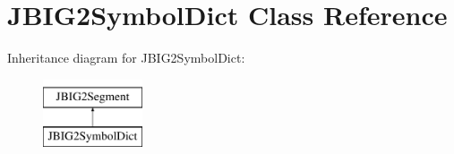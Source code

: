 \hypertarget{class_j_b_i_g2_symbol_dict}{}\section{J\+B\+I\+G2\+Symbol\+Dict Class Reference}
\label{class_j_b_i_g2_symbol_dict}
Inheritance diagram for J\+B\+I\+G2\+Symbol\+Dict\+:\begin{figure}[H]
\begin{center}
\leavevmode
\includegraphics[height=2.000000cm]{class_j_b_i_g2_symbol_dict}
\end{center}
\end{figure}
